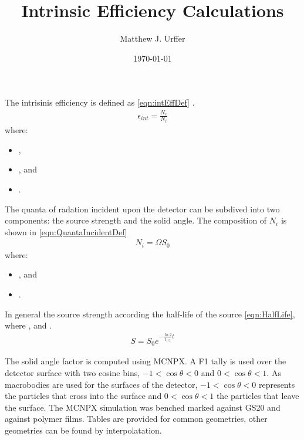 \documentclass[draftcls,onecolumn]{IEEEtran}
\begin{document}
\title{Intrinsic Efficiency Calculations}
\author{Matthew J. Urffer}
\date{\today}
\maketitle

\printnomenclature
\printindex

\listoftodos
\tableofcontents
\listoffigures
\listoftables
\lstlistoflistings

The intrisinis efficiency is defined as \eqref{eqn:intEffDef} \cite{knoll_radiation_2009}.
\begin{align}
  \label{eqn:intEffDef}
  \epsilon_{int} = \frac{N_c}{N_i}
\end{align}
where:
\begin{itemize}
  \item[] ,
  \item[] , and
  \item[] .
\end{itemize}
The quanta of radation incident upon the detector can be subdived into two components: the source strength and the solid angle.
The composition of $N_i$ is shown in \eqref{eqn:QuantaIncidentDef}
\begin{align}
  \label{eqn:QuantaIncidentDef}
  N_i = \Omega S_0
\end{align}
where:
\begin{itemize}
  \item[] , and 
  \item[] .
\end{itemize}
In general the source strength according the half-life of the source \eqref{eqn:HalfLife}, where ,  and .
\begin{align}
  \label{eqn:HalfLife}
  S = S_0 e^{-\frac{\ln{2}}{t_{1/2}} t}
\end{align}

The solid angle factor is computed using MCNPX. 
A F1 tally is used over the detector surface with two cosine bins, $-1<\cos\theta<0$ and $0<\cos\theta<1$.
As macrobodies are used for the surfaces of the detector, $-1<\cos\theta<0$ represents the particles that cross into the surface and $0<\cos\theta<1$ the particles that leave the surface.
The MCNPX simulation was benched marked against GS20 and against polymer films.
Tables are provided for common geometries, other geometries can be found by interpolatation.
\end{document}
